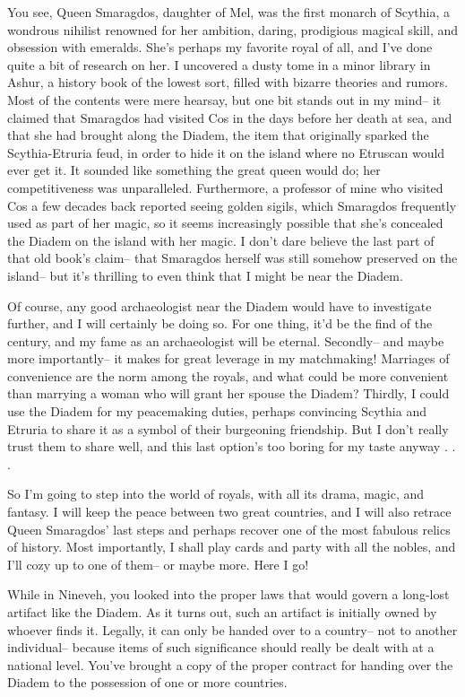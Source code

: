 \documentclass[char]{Kos}
\begin{document}
You see, Queen Smaragdos, daughter of Mel, was the first monarch of Scythia, a wondrous nihilist renowned for her ambition, daring, prodigious magical skill, and obsession with emeralds. She's perhaps my favorite royal of all, and I've done quite a bit of research on her. I uncovered a dusty tome in a minor library in Ashur, a history book of the lowest sort, filled with bizarre theories and rumors. Most of the contents were mere hearsay, but one bit stands out in my mind-- it claimed that Smaragdos had visited Cos in the days before her death at sea, and that she had brought along the Diadem, the item that originally sparked the Scythia-Etruria feud, in order to hide it on the island where no Etruscan would ever get it. It sounded like something the great queen would do; her competitiveness was unparalleled. Furthermore, a professor of mine who visited Cos a few decades back reported seeing golden sigils, which Smaragdos frequently used as part of her magic, so it seems increasingly possible that she's concealed the Diadem on the island with her magic. I don't dare believe the last part of that old book's claim-- that Smaragdos herself was still somehow preserved on the island-- but it's thrilling to even think that I might be near the Diadem.

Of course, any good archaeologist near the Diadem would have to investigate further, and I will certainly be doing so. For one thing, it'd be the find of the century, and my fame as an archaeologist will be eternal. Secondly-- and maybe more importantly-- it makes for great leverage in my matchmaking! Marriages of convenience are the norm among the royals, and what could be more convenient than marrying a woman who will grant her spouse the Diadem? Thirdly, I could use the Diadem for my peacemaking duties, perhaps convincing Scythia and Etruria to share it as a symbol of their burgeoning friendship. But I don't really trust them to share well, and this last option's too boring for my taste anyway . . .

So I'm going to step into the world of royals, with all its drama, magic, and fantasy. I will keep the peace between two great countries, and I will also retrace Queen Smaragdos' last steps and perhaps recover one of the most fabulous relics of history. Most importantly, I shall play cards and party with all the nobles, and I'll cozy up to one of them-- or maybe more. Here I go!

\begin{itemz}[Notes]
  \item While in Nineveh, you looked into the proper laws that would govern a long-lost artifact like the Diadem. As it turns out, such an artifact is initially owned by whoever finds it. Legally, it can only be handed over to a country-- not to another individual-- because items of such significance should really be dealt with at a national level. You've brought a copy of the proper contract for handing over the Diadem to the possession of one or more countries.
  \end{itemz}
\end{document}

